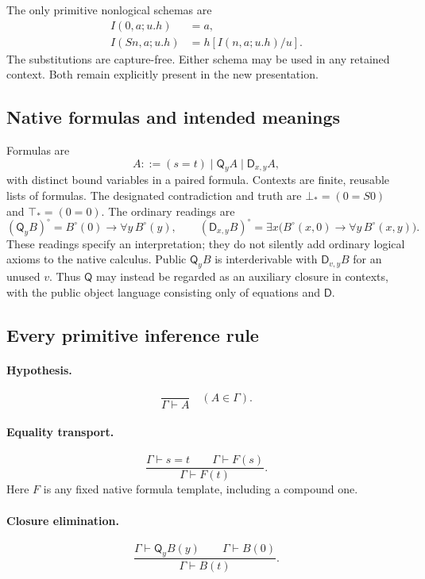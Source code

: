 \documentclass[11pt,letterpaper]{article}
\theoremstyle{definition}\newtheorem{definition}[theorem]{Definition}
\theoremstyle{remark}\newtheorem{remark}[theorem]{Remark}
\newcommand{\D}{\mathsf D}
\newcommand{\Q}{\mathsf Q}
\begin{document}
The only primitive nonlogical schemas are
\begin{align}
 I(0,a;u.h)&=a, \tag{I0}\label{eq:main-I0}\\
 I(Sn,a;u.h)&=h[I(n,a;u.h)/u]. \tag{IS}\label{eq:main-IS}
\end{align}
The substitutions are capture-free. Either schema may be used in any
retained context. Both remain explicitly present in the new presentation.

\subsection{Native formulas and intended meanings}

Formulas are
\[
 A::=(s=t)\mid \Q_y A\mid \D_{x,y} A,
\]
with distinct bound variables in a paired formula. Contexts are finite,
reusable lists of formulas. The designated contradiction and truth are
$\bot_*=(0=S0)$ and $\top_*=(0=0)$.
The ordinary readings are
\[
 (\Q_yB)^\circ=B^\circ(0)\to\forall y\,B^\circ(y),
 \qquad
 (\D_{x,y}B)^\circ=
 \exists x\bigl(B^\circ(x,0)\to\forall y\,B^\circ(x,y)\bigr).
 \tag{Readings}\label{eq:readings}
\]
These readings specify an interpretation; they do not silently add
ordinary logical axioms to the native calculus. Public $\Q_yB$ is
interderivable with $\D_{v,y}B$ for an unused $v$. Thus $\Q$ may instead
be regarded as an auxiliary closure in contexts, with the public object
language consisting only of equations and $\D$.

\subsection{Every primitive inference rule}

\paragraph{Hypothesis.}
\[
 \frac{}{\Gamma\vdash A}\quad(A\in\Gamma).
 \tag{Hyp}
\]

\paragraph{Equality transport.}
\[
 \frac{\Gamma\vdash s=t\qquad\Gamma\vdash F(s)}
      {\Gamma\vdash F(t)}.
 \tag{Tr}
\]
Here $F$ is any fixed native formula template, including a compound one.

\paragraph{Closure elimination.}
\[
 \frac{\Gamma\vdash\Q_y B(y)\qquad\Gamma\vdash B(0)}
      {\Gamma\vdash B(t)}.
 \tag{QE}
\]
\end{document}
